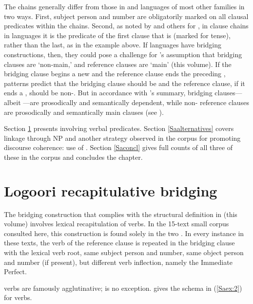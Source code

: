 \documentclass[output=paper]{LSP/langsci}
\begin{document}
The  chains generally differ from those in  and  languages of most other families in two ways. First, subject person and number are obligatorily marked on all clausal predicates within the  chains. Second, as noted by \citet{Haspelmath.1995} and others for , in clause chains in  languages it is the predicate of the first clause that is  (marked for tense), rather than the last, as in the  example above. If  languages have bridging constructions, then, they could pose a challenge for \citeauthor{guerin18}’s assumption that bridging clauses are ‘non-main,’ and reference clauses are ‘main’ (this volume). If the bridging clause begins a new  and the reference clause ends the preceding ,  patterns predict that the bridging clause should be  and the reference clause, if it ends a , should be non-. But in accordance with \citeauthor{guerin18}’s summary,  bridging clauses—albeit —are prosodically and semantically dependent, while non- reference clauses are prosodically and semantically main clauses (see ). 

Section \ref{Sarecap.bridg} presents   involving verbal predicates. Section \ref{Saalternatives} covers linkage through NP  and another strategy observed in the corpus for promoting discourse coherence: use of . Section \ref{Saconcl} gives full counts of all three of these in the corpus and concludes the chapter.

\section{Logoori recapitulative bridging}
\label{Sarecap.bridg}
The  bridging construction that complies with the structural definition in \citeauthor{guerin18} (this volume) involves lexical recapitulation of verbs. In the 15-text small corpus consulted here, this construction is found solely in the two . In every instance in these texts, the verb of the reference clause is repeated in the bridging clause with the lexical verb root, same subject person and number, same object person and number (if present), but different verb inflection, namely the Immediate Perfect. 

 verbs are famously agglutinative;  is no exception. \citet[][90]{Nurse2003} gives the schema in (\ref{Saex:2}) for  verbs.
\end{document}

